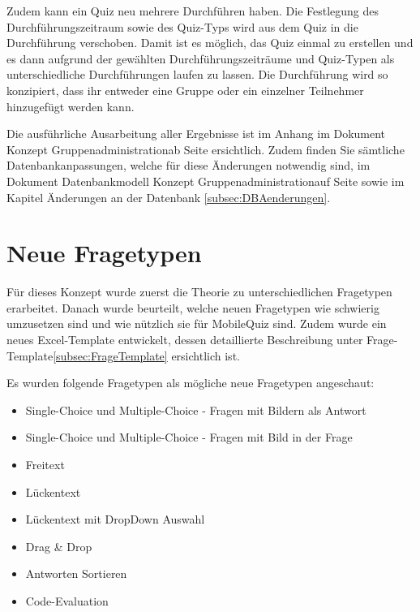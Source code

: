 Zudem kann ein Quiz neu mehrere Durchführen haben. Die Festlegung des Durchführungszeitraum sowie des Quiz-Typs wird aus dem Quiz in die Durchführung verschoben. Damit ist es möglich, das Quiz einmal zu erstellen und es dann aufgrund der gewählten Durchführungszeiträume und Quiz-Typen als unterschiedliche Durchführungen laufen zu lassen. Die Durchführung wird so konzipiert, dass ihr entweder eine Gruppe oder ein einzelner Teilnehmer hinzugefügt werden kann. 

\bigskip

Die ausführliche Ausarbeitung aller Ergebnisse ist im Anhang im Dokument \glqq Konzept Gruppenadministration\grqq ab Seite \hyperlink{page.\getpagerefnumber{pdf:gruppenadmin}}{} ersichtlich. Zudem finden Sie sämtliche Datenbankanpassungen, welche für diese Änderungen notwendig sind, im Dokument \glqq Datenbankmodell Konzept Gruppenadministration\grqq auf Seite \hyperlink{page.\getpagerefnumber{pdf:dbgruppenadmin}}{} sowie im Kapitel Änderungen an der Datenbank \ref{subsec:DBAenderungen}.


\section{Neue Fragetypen}
Für dieses Konzept wurde zuerst die Theorie zu unterschiedlichen Fragetypen erarbeitet. Danach wurde beurteilt, welche neuen Fragetypen wie schwierig umzusetzen sind und wie nützlich sie für MobileQuiz sind. Zudem wurde ein neues Excel-Template entwickelt, dessen detaillierte Beschreibung unter \glqq Frage-Template\grqq  \ref{subsec:FrageTemplate} ersichtlich ist.

\bigskip

\noindent Es wurden folgende Fragetypen als mögliche neue Fragetypen angeschaut:
\begin{itemize}
	\item Single-Choice und Multiple-Choice - Fragen mit Bildern als Antwort
	\item Single-Choice und Multiple-Choice - Fragen mit Bild in der Frage
	\item Freitext
	\item Lückentext
	\item Lückentext mit DropDown Auswahl
	\item Drag \& Drop
	\item Antworten Sortieren
	\item Code-Evaluation
\end{itemize}

